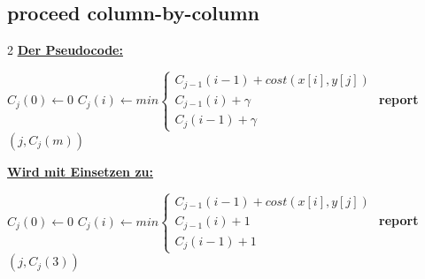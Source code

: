\subsection*{proceed column-by-column}

\begin{multicols}{2}
    \noindent \textbf{\underline{Der Pseudocode:}}
    \begin{algorithmic}
            \State $C_j(0) \gets 0$
                \State $C_j (i) \gets min \begin{cases}
                                              C_{j-1}(i-1) + cost(x[i], y[j]) \\
                                              C_{j-1}(i) + \gamma \\ C_j (i-1) + \gamma
                \end{cases}$
            \EndFor
                \Statex \textbf{report} $(j, C_j (m))$
            \EndIf
        \EndFor
    \end{algorithmic}
    \columnbreak
    \textbf{\underline{Wird mit Einsetzen zu:}}
    \begin{algorithmic}
            \State $C_j(0) \gets 0$
                \State $C_j (i) \gets min \begin{cases}
                                              C_{j-1}(i-1) + cost(x[i], y[j]) \\
                                              C_{j-1}(i) + 1 \\ C_j (i-1) + 1
                \end{cases}$
            \EndFor
                \Statex \textbf{report} $(j, C_j (3))$
            \EndIf
        \EndFor
    \end{algorithmic}
\end{multicols}

\newpage
